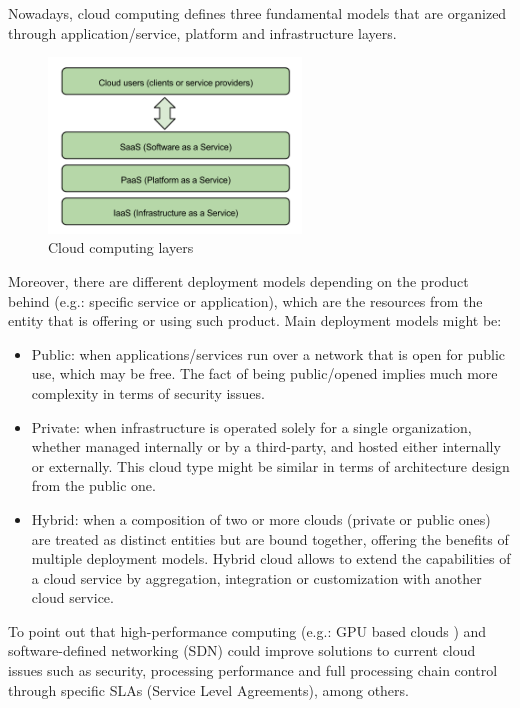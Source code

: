 Nowadays, cloud computing defines three fundamental models that are organized through application/service, platform and infrastructure layers.

\begin{figure}[htb]
\begin{center}
\includegraphics[width=0.6\textwidth]{./images/Cloud_computing_layers.png}
\caption{Cloud computing layers}
\label{F:cloudComputingLayers}
\end{center}
\end{figure}

Moreover, there are different deployment models depending on the product behind (e.g.: specific service or application), which are the resources from the entity that is offering or using such product. Main deployment models might be:

\begin{itemize}
\item Public: when applications/services run over a network that is open for public use, which may be free. The fact of being public/opened implies much more complexity in terms of security issues.
\item Private: when infrastructure is operated solely for a single organization, whether managed internally or by a third-party, and hosted either internally or externally. This cloud type might be similar in terms of architecture design from the public one.
\item Hybrid: when a composition of two or more clouds (private or public ones) are treated as distinct entities but are bound together, offering the benefits of multiple deployment models. Hybrid cloud allows to extend the capabilities of a cloud service by aggregation, integration or customization with another cloud service.
\end{itemize}

To point out that high-performance computing (e.g.: GPU based clouds \cite{gpu}) and software-defined networking (SDN) could improve solutions to current cloud issues such as security, processing performance and full processing chain control through specific SLAs (Service Level Agreements), among others.

